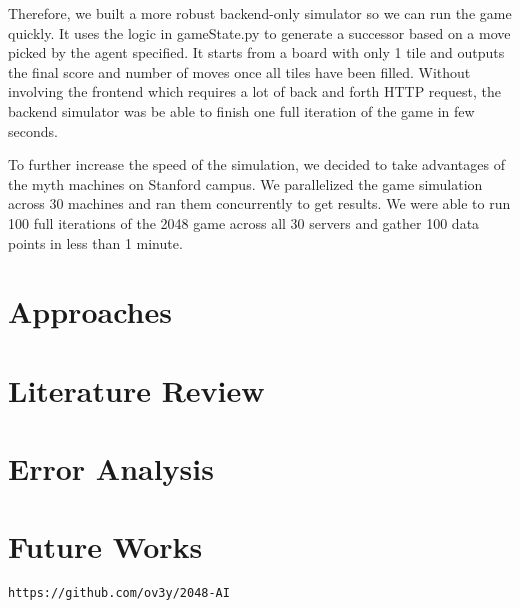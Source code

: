 \documentclass[11pt,twocolumn]{article}
\begin{document}
Therefore, we built a more robust backend-only simulator so we can run the game quickly. It uses the logic in gameState.py to generate a successor based on a move picked by the agent specified. It starts from a board with only 1 tile and outputs the final score and number of moves once all tiles have been filled. Without involving the frontend which requires a lot of back and forth HTTP request, the backend simulator was be able to finish one full iteration of the game in few seconds.

To further increase the speed of the simulation, we decided to take advantages of the myth machines on Stanford campus. We parallelized the game simulation across 30 machines and ran them concurrently to get results. We were able to run 100 full iterations of the 2048 game across all 30 servers and gather 100 data points in less than 1 minute.

\section{Approaches}

\section{Literature Review}

\section{Error Analysis}

\section{Future Works}

\begin{thebibliography}{9}

 \texttt{https://github.com/ov3y/2048-AI}

\end{thebibliography}
\end{document}
